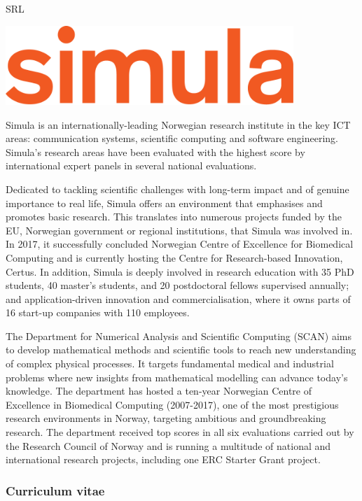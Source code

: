 \begin{sitedescription}{SRL}

\begin{center}
\includegraphics[height=3cm]{Participants/Logos/SRL.png}
\end{center}

Simula is an internationally-leading Norwegian research institute in the key
ICT areas: communication systems, scientific computing and software
engineering. Simula's research areas have been evaluated with the highest
score by international expert panels in several national evaluations.

Dedicated to tackling scientific challenges with long-term impact and of
genuine importance to real life, Simula offers an environment that emphasises
and promotes basic research. This translates into numerous projects funded by
the EU, Norwegian government or regional institutions, that Simula was
involved in. In 2017, it successfully concluded Norwegian Centre of Excellence
for Biomedical Computing and is currently hosting the Centre for
Research-based Innovation, Certus. In addition, Simula is deeply involved in
research education with 35 PhD students, 40 master's students, and 20
postdoctoral fellows supervised annually; and application-driven innovation
and commercialisation, where it owns parts of 16 start-up companies with 110
employees.

The Department for Numerical Analysis and Scientific Computing (SCAN) aims to
develop mathematical methods and scientific tools to reach new understanding
of complex physical processes. It targets fundamental medical and industrial
problems where new insights from mathematical modelling can advance today's
knowledge. The department has hosted a ten-year Norwegian Centre of Excellence
in Biomedical Computing (2007-2017), one of the most prestigious research
environments in Norway, targeting ambitious and groundbreaking research. The
department received top scores in all six evaluations carried out by the
Research Council of Norway and is running a multitude of national and
international research projects, including one ERC Starter Grant project.

\subsubsection*{Curriculum vitae}


\end{sitedescription}
